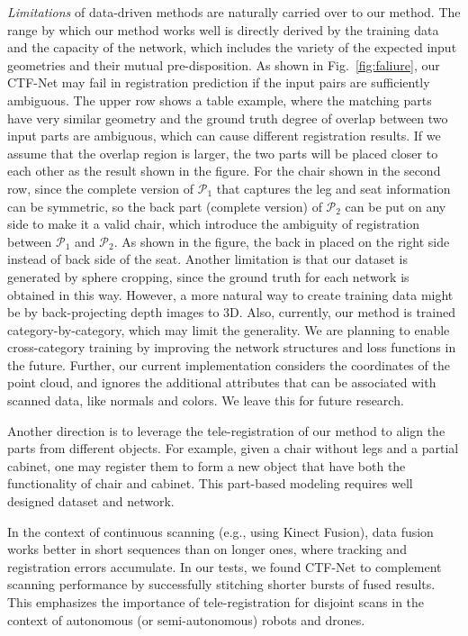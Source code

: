 {\em Limitations} of data-driven methods are naturally carried over to our method. The range by which our method works well is directly derived by the training data and the capacity of the network, which includes the variety of the expected input geometries and their mutual pre-disposition. 
As shown in Fig.~\ref{fig:faliure}, our CTF-Net may fail in registration prediction if the input pairs are sufficiently ambiguous. The upper row shows a table example, where the matching parts have very similar geometry and the ground truth degree of overlap between two input parts are ambiguous, which can cause different registration results. If we assume that the overlap region is larger, the two parts will be placed closer to each other as the result shown in the figure. 
For the chair shown in the second row, since the complete version of $\mathcal{P}_1$ that captures the leg and seat information can be symmetric, so the back part (complete version) of $\mathcal{P}_2$ can be put on any side to make it a valid chair, which introduce the ambiguity of registration between $\mathcal{P}_1$ and $\mathcal{P}_2$. As shown in the figure, the back in placed on the right side instead of back side of the seat.
Another limitation is that our dataset is generated by sphere cropping, since the ground truth for each network is obtained in this way. However, a more natural way to create training data might be by back-projecting depth images to 3D.
Also, currently, our method is trained category-by-category, which may limit the generality. We are planning to enable cross-category training by improving the network structures and loss functions in the future.
Further, our current implementation considers the coordinates of the point cloud, and ignores the additional attributes that can be associated with scanned data, like normals and colors. We leave this for future research.

Another direction is to leverage the tele-registration of our method to align the parts from different objects. For example, given a chair without legs and a partial cabinet, one may register them to form a new object that have both the functionality of chair and cabinet. This part-based modeling requires well designed dataset and network.

In the context of continuous scanning (e.g., using Kinect Fusion), data fusion works better in short sequences than on longer ones, where tracking and registration errors accumulate. 
In our tests, we found CTF-Net to
complement scanning performance by successfully stitching shorter bursts of fused results. This emphasizes the importance of tele-registration for disjoint scans in the context of autonomous (or semi-autonomous) robots and drones.
